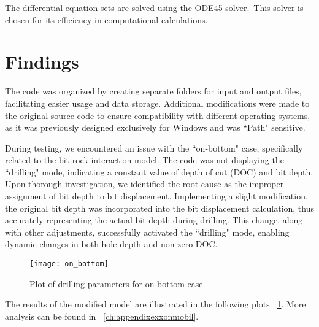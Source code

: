 \begin{mathwhere}[1.0in]
\end{mathwhere}

The differential equation sets are solved using the ODE45 solver.\ This solver is chosen for its efficiency in computational calculations.


\section{Findings}
 
The code was organized by creating separate folders for input and output files, facilitating easier usage and data storage. Additional modifications were made to the original source code to ensure compatibility with different operating systems, as it was previously designed exclusively for Windows and was ``Path" sensitive.

During testing, we encountered an issue with the ``on-bottom" case, specifically related to the bit-rock interaction model. The code was not displaying the ``drilling" mode, indicating a constant value of depth of cut (DOC) and bit depth. Upon thorough investigation, we identified the root cause as the improper assignment of bit depth to bit displacement. Implementing a slight modification, the original bit depth was incorporated into the bit displacement calculation, thus accurately representing the actual bit depth during drilling. This change, along with other adjustments, successfully activated the ``drilling" mode, enabling dynamic changes in both hole depth and non-zero DOC.

\begin{figure}
  \centering
  \texttt{[image: on\_bottom]}
  \caption[Plots of on bottom case.]{Plot of drilling parameters for on bottom case.}\label{findings}
\end{figure}

The results of the modified model are illustrated in the following plots \figurename~\ref{findings}. More analysis can be found in \appendixname~\ref{ch:appendixexxonmobil}. 